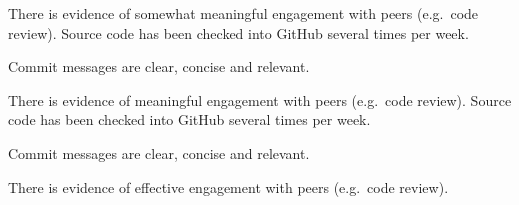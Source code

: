 \documentclass{../../fal_assignment}
\begin{document}
\begin{markingrubric}
            \par There is evidence of somewhat meaningful engagement with peers (e.g.\ code review).
        \grade Source code has been checked into GitHub several times per week.
            \par Commit messages are clear, concise and relevant.
            \par There is evidence of meaningful engagement with peers (e.g.\ code review).
        \grade Source code has been checked into GitHub several times per week.
            \par Commit messages are clear, concise and relevant.
            \par There is evidence of effective engagement with peers (e.g.\ code review).
%
\end{markingrubric}
\end{document}
